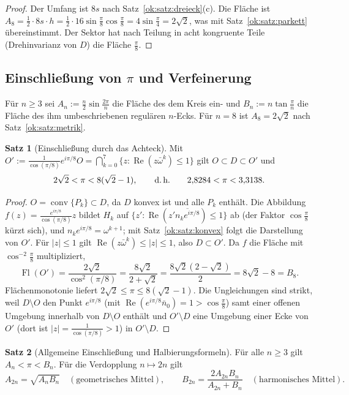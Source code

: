 \documentclass[a4paper,12pt,twoside]{report}
\theoremstyle{definition}
\newtheorem{satz}{Satz}
\begin{document}
\begin{proof}
Der Umfang ist $8s$ nach Satz~\ref{ok:satz:dreieck}(c). Die Fläche ist $A_8=\frac12\cdot8s\cdot h=\frac12\cdot16\sin\frac\pi8\cos\frac\pi8=4\sin\frac\pi4=2\sqrt2$, was mit Satz~\ref{ok:satz:parkett} übereinstimmt. Der Sektor hat nach Teilung in acht kongruente Teile (Drehinvarianz von $D$) die Fläche $\frac\pi8$.
\end{proof}

\subsection{Einschließung von $\pi$ und Verfeinerung}
\label{sec:ok:pi}

Für $n\ge3$ sei $A_n:=\frac n2\sin\frac{2\pi}n$ die Fläche des dem Kreis ein- und $B_n:=n\tan\frac\pi n$ die Fläche des ihm umbeschriebenen regulären $n$-Ecks. Für $n=8$ ist $A_8=2\sqrt2$ nach Satz~\ref{ok:satz:metrik}.

\begin{satz}[Einschließung durch das Achteck]\label{ok:satz:einschl}
Mit $O':=\frac1{\cos(\pi/8)}e^{i\pi/8}O=\bigcap_{k=0}^7\{z:\operatorname{Re}(z\bar\omega^k)\le1\}$ gilt $O\subset D\subset O'$ und
\[
2\sqrt2<\pi<8(\sqrt2-1),\qquad\text{d.\,h.}\qquad 2{,}8284<\pi<3{,}3138 .
\]
\end{satz}

\begin{proof}
$O=\operatorname{conv}\{P_k\}\subset D$, da $D$ konvex ist und alle $P_k$ enthält. Die Abbildung $f(z)=\frac{e^{i\pi/8}}{\cos(\pi/8)}z$ bildet $H_k$ auf $\{z':\operatorname{Re}(z'\overline{n_ke^{i\pi/8}})\le1\}$ ab (der Faktor $\cos\frac\pi8$ kürzt sich), und $n_ke^{i\pi/8}=\omega^{k+1}$; mit Satz~\ref{ok:satz:konvex} folgt die Darstellung von $O'$. Für $|z|\le1$ gilt $\operatorname{Re}(z\bar\omega^k)\le|z|\le1$, also $D\subset O'$. Da $f$ die Fläche mit $\cos^{-2}\frac\pi8$ multipliziert,
\[
\operatorname{Fl}(O')=\frac{2\sqrt2}{\cos^2(\pi/8)}=\frac{8\sqrt2}{2+\sqrt2}=\frac{8\sqrt2(2-\sqrt2)}{2}=8\sqrt2-8=B_8 .
\]
Flächenmonotonie liefert $2\sqrt2\le\pi\le8(\sqrt2-1)$. Die Ungleichungen sind strikt, weil $D\setminus O$ den Punkt $e^{i\pi/8}$ (mit $\operatorname{Re}(e^{i\pi/8}\bar n_0)=1>\cos\frac\pi8$) samt einer offenen Umgebung innerhalb von $D\setminus O$ enthält und $O'\setminus D$ eine Umgebung einer Ecke von $O'$ (dort ist $|z|=\frac1{\cos(\pi/8)}>1$) in $O'\setminus D$.
\end{proof}

\begin{satz}[Allgemeine Einschließung und Halbierungsformeln]\label{ok:satz:verdopp}
Für alle $n\ge3$ gilt $A_n<\pi<B_n$. Für die Verdopplung $n\mapsto2n$ gilt
\[
A_{2n}=\sqrt{A_nB_n}\quad(\text{geometrisches Mittel}),\qquad
B_{2n}=\frac{2A_{2n}B_n}{A_{2n}+B_n}\quad(\text{harmonisches Mittel}).
\]
\end{satz}
\end{document}
